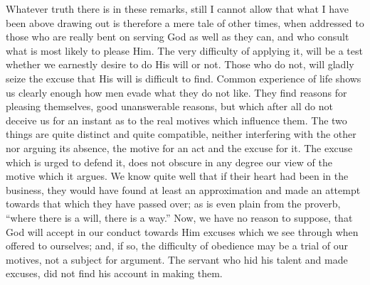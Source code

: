 Whatever truth there is in these remarks, still I cannot allow that
what I have been above drawing out is therefore a mere tale of other
times, when addressed to those who are really bent on serving God as
well as they can, and who consult what is most likely to please Him.
The very difficulty of applying it, will be a test whether we
earnestly desire to do His will or not. Those who do not, will gladly
seize the excuse that His will is difficult to find. Common experience
of life shows us clearly enough how men evade what they do not like.
They find reasons for pleasing themselves, good unanswerable reasons,
but which after all do not deceive us for an instant as to the real
motives which influence them. The two things are quite distinct and
quite compatible, neither interfering with the other nor arguing its
absence, the motive for an act and the excuse for it. The excuse which
is urged to defend it, does not obscure in any degree our view of the
motive which it argues. We know quite well that if their heart had
been in the business, they would have found at least an approximation
and made an attempt towards that which they have passed over; as is
even plain from the proverb, ``where there is a will, there is a
way.'' Now, we have no reason to suppose, that God will accept in
our conduct towards Him excuses which we see through when offered to ourselves; and, if so, the difficulty of obedience may be a
trial of our motives, not a subject for argument. The servant who hid
his talent and made excuses, did not find his account in making them.

